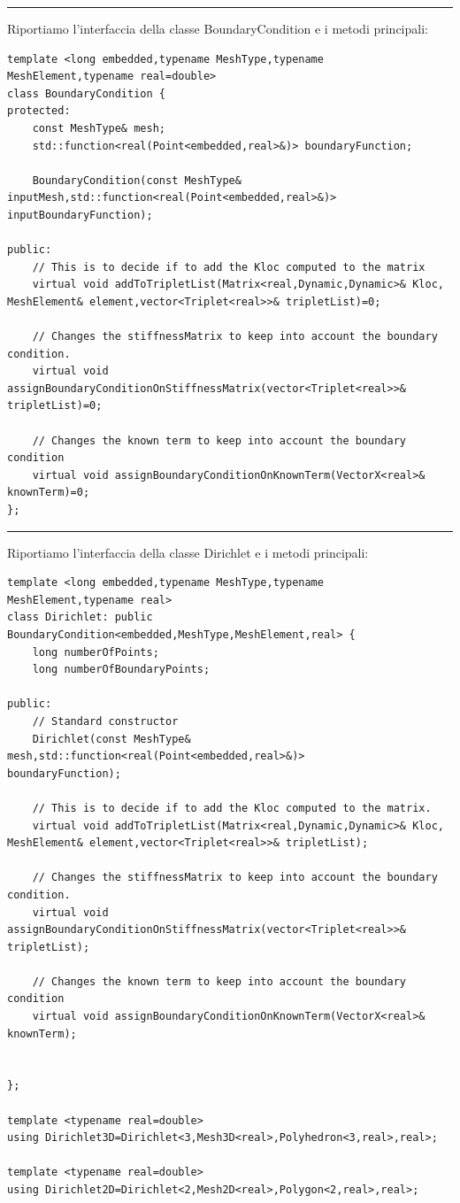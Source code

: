 \documentclass[oneside,12pt]{book}  %
\theoremstyle{plain}
\theoremstyle{definition}
\theoremstyle{remark}
\numberwithin{equation}{chapter} %
\begin{document}
\noindent\rule{14cm}{1pt}

Riportiamo l'interfaccia della classe BoundaryCondition e i metodi principali:

\begin{verbatim}
template <long embedded,typename MeshType,typename MeshElement,typename real=double>
class BoundaryCondition {
protected:
    const MeshType& mesh;
    std::function<real(Point<embedded,real>&)> boundaryFunction;

    BoundaryCondition(const MeshType&
inputMesh,std::function<real(Point<embedded,real>&)> inputBoundaryFunction);

public:
    // This is to decide if to add the Kloc computed to the matrix
    virtual void addToTripletList(Matrix<real,Dynamic,Dynamic>& Kloc,
MeshElement& element,vector<Triplet<real>>& tripletList)=0;
	
    // Changes the stiffnessMatrix to keep into account the boundary condition.
    virtual void assignBoundaryConditionOnStiffnessMatrix(vector<Triplet<real>>&
tripletList)=0;
	
    // Changes the known term to keep into account the boundary condition
    virtual void assignBoundaryConditionOnKnownTerm(VectorX<real>& knownTerm)=0; 		
};

\end{verbatim}


\noindent\rule{14cm}{1pt}

Riportiamo l'interfaccia della classe Dirichlet e i metodi principali:

\begin{verbatim}
template <long embedded,typename MeshType,typename MeshElement,typename real>
class Dirichlet: public BoundaryCondition<embedded,MeshType,MeshElement,real> {
    long numberOfPoints;
    long numberOfBoundaryPoints;

public:
    // Standard constructor
    Dirichlet(const MeshType& mesh,std::function<real(Point<embedded,real>&)> 
boundaryFunction);
	
    // This is to decide if to add the Kloc computed to the matrix.
    virtual void addToTripletList(Matrix<real,Dynamic,Dynamic>& Kloc,
MeshElement& element,vector<Triplet<real>>& tripletList);
	
    // Changes the stiffnessMatrix to keep into account the boundary condition.
    virtual void assignBoundaryConditionOnStiffnessMatrix(vector<Triplet<real>>&
tripletList);
	
    // Changes the known term to keep into account the boundary condition
    virtual void assignBoundaryConditionOnKnownTerm(VectorX<real>& knownTerm);
	
	
};

template <typename real=double>
using Dirichlet3D=Dirichlet<3,Mesh3D<real>,Polyhedron<3,real>,real>;

template <typename real=double>
using Dirichlet2D=Dirichlet<2,Mesh2D<real>,Polygon<2,real>,real>;
\end{verbatim}
\end{document}

